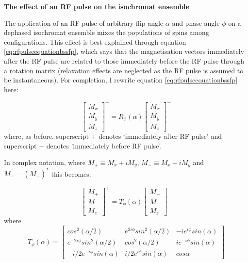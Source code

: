 \textbf{The effect of an RF pulse on the isochromat ensemble} 

The application of an RF pulse of arbitrary flip angle $\alpha$ and phase angle $\phi$ on a dephased isochromat ensemble mixes the populations of spins among configurations.
This effect is best explained through equation \ref{eq:rfpulseequationbssfp}, which says that the magnetisation vectors immediately after the RF pulse are related to those immediately before the RF pulse through a rotation matrix (relaxation effects are neglected as the RF pulse is assumed to be instantaneous).
For completion, I rewrite equation \ref{eq:rfpulseequationbssfp} here:

\begin{equation}
    \begin{bmatrix} 
    M_x \\
    M_y \\
    M_z
    \end{bmatrix}^+ = 
        R_{\phi}(\alpha)
    \begin{bmatrix} 
    M_x \\
    M_y \\
    M_z
    \end{bmatrix}^-
\end{equation}
where, as before, superscript $+$ denotes `immediately after RF pulse' and superscript $-$ denotes 'immediately before RF pulse'.

\hfill

In complex notation, where $M_+ \equiv M_x + i M_y$,  $M_- \equiv M_x - i M_y$ and $M_- = (M_+)^*$ this becomes:

\begin{equation}\label{eq:magnbeforestates}
    \begin{bmatrix} 
    M_+ \\
    M_- \\
    M_z
    \end{bmatrix}^+ = 
        T_{\phi}(\alpha)
    \begin{bmatrix} 
    M_+ \\
    M_- \\
    M_z
    \end{bmatrix}^-
\end{equation}
where 
\begin{equation}\label{eq:woessnerFn2}
    T_{\phi}(\alpha) = 
    \begin{bmatrix}
        cos^2(\alpha/2) & e^{2i\phi} sin^2(\alpha/2) & - i e^{i \phi} sin(\alpha) \\
        e^{-2i\phi} sin^2(\alpha/2) & cos^2(\alpha/2) & i e^{-i \phi} sin(\alpha) \\
        - i/2 e^{-i \phi} sin(\alpha) & i/2 e^{i \phi} sin(\alpha) & cos \alpha
    \end{bmatrix}
\end{equation}

